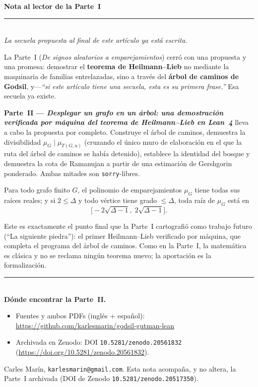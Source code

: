 \documentclass[11pt]{article}
\newcommand{\lean}[1]{\texttt{#1}}
\begin{document}
{\centering
{\large\bfseries Nota al lector de la Parte~I}\\[2pt]
{\color{ggteal}\rule{0.5\textwidth}{0.8pt}}\\[6pt]
{\itshape La secuela propuesta al final de este art\'iculo ya est\'a escrita.}\\[14pt]
}

La Parte~I (\emph{De signos aleatorios a emparejamientos}) cerr\'o con una propuesta
y una promesa: demostrar el \textbf{teorema de Heilmann--Lieb} no mediante la
maquinaria de familias entrelazadas, sino a trav\'es del \textbf{\'arbol de caminos
de Godsil}, y---\emph{``si este art\'iculo tiene una secuela, esta es su primera
frase.''} Esa secuela ya existe.

\textbf{Parte~II --- \emph{Desplegar un grafo en un \'arbol: una demostraci\'on
verificada por m\'aquina del teorema de Heilmann--Lieb en Lean~4}} lleva a cabo la
propuesta por completo. Construye el \'arbol de caminos, demuestra la divisibilidad
$\mu_G \mid \mu_{T(G,u)}$ (cruzando el \'unico muro de elaboraci\'on en el que la
ruta del \'arbol de caminos se hab\'ia detenido), establece la identidad del bosque
y demuestra la cota de Ramanujan a partir de una estimaci\'on de Gershgorin
ponderado. Ambas mitades son \lean{sorry}-libres.

\begin{tcolorbox}[colframe=ggteal,colback=ggband!40,arc=3pt,boxrule=0.9pt]
\centering
Para todo grafo finito $G$, el polinomio de emparejamientos $\mu_G$ tiene todas sus
ra\'ices reales; y si $2\le\Delta$ y todo v\'ertice tiene grado $\le\Delta$, toda
ra\'iz de $\mu_G$ est\'a en
\[
  \bigl[-2\sqrt{\Delta-1},\;2\sqrt{\Delta-1}\bigr].
\]
\end{tcolorbox}

Este es exactamente el punto final que la Parte~I cartografi\'o como trabajo futuro
(``La siguiente piedra''): el primer Heilmann--Lieb verificado por m\'aquina, que
completa el programa del \'arbol de caminos. Como en la Parte~I, la matem\'atica es
cl\'asica y no se reclama ning\'un teorema nuevo; la aportaci\'on es la
formalizaci\'on.

\bigskip
{\color{ggteal}\rule{\textwidth}{0.4pt}}\\[4pt]
\textbf{D\'onde encontrar la Parte~II.}
\begin{itemize}\setlength{\itemsep}{1pt}
\item Fuentes y ambos PDFs (ingl\'es + espa\~nol):
  \url{https://github.com/karlesmarin/godsil-gutman-lean}
\item Archivada en Zenodo: DOI \texttt{10.5281/zenodo.20561832}
  (\url{https://doi.org/10.5281/zenodo.20561832}).
\end{itemize}

\vfill
{\footnotesize\color{gray}
Carles Mar\'in, \texttt{karlesmarin@gmail.com}. Esta nota acompa\~na, y no altera, la
Parte~I archivada (DOI de Zenodo \texttt{10.5281/zenodo.20517350}).}
\end{document}

